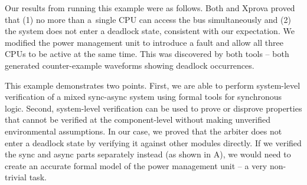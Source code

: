 

Our results from running this example were as follows. Both \ind{} and Xprova
proved that (1) no more than a~single CPU can access the bus simultaneously
and (2) the system does not enter a deadlock state, consistent with our
expectation. We modified the power management unit to introduce a fault and
allow all three CPUs to be active at the same time. This was discovered by
both tools -- both generated counter-example waveforms showing deadlock
occurrences.





This example demonstrates two points. First, we are able to perform
system-level verification of a mixed sync-async system using formal tools for
synchronous logic. Second, system-level verification can be used to prove or
disprove properties that cannot be verified at the component-level without
making unverified environmental assumptions. In our case, we proved that the
arbiter does not enter a deadlock state by verifying it against other modules
directly. If we verified the sync and async parts separately instead (as shown
in A), we would need to create an accurate formal model of
the power management unit -- a very non-trivial task.
